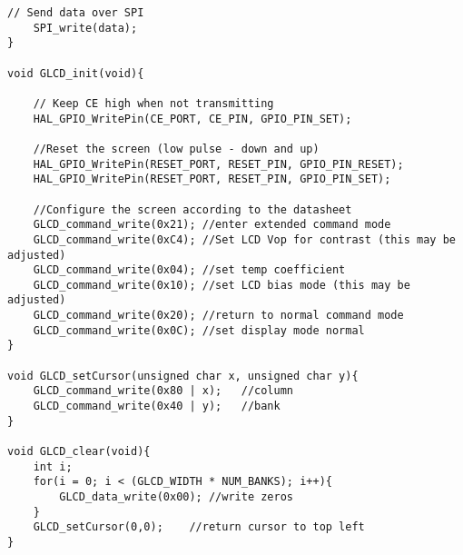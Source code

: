 \begin{lstlisting}[style=CStyle]
	// Send data over SPI
	SPI_write(data);
}

void GLCD_init(void){

	// Keep CE high when not transmitting
	HAL_GPIO_WritePin(CE_PORT, CE_PIN, GPIO_PIN_SET);

	//Reset the screen (low pulse - down and up)
	HAL_GPIO_WritePin(RESET_PORT, RESET_PIN, GPIO_PIN_RESET);
	HAL_GPIO_WritePin(RESET_PORT, RESET_PIN, GPIO_PIN_SET);

	//Configure the screen according to the datasheet
	GLCD_command_write(0x21); //enter extended command mode
	GLCD_command_write(0xC4); //Set LCD Vop for contrast (this may be adjusted)
	GLCD_command_write(0x04); //set temp coefficient
	GLCD_command_write(0x10); //set LCD bias mode (this may be adjusted)
	GLCD_command_write(0x20); //return to normal command mode
	GLCD_command_write(0x0C); //set display mode normal
}

void GLCD_setCursor(unsigned char x, unsigned char y){
	GLCD_command_write(0x80 | x);	//column
	GLCD_command_write(0x40 | y);	//bank
}

void GLCD_clear(void){
	int i;
	for(i = 0; i < (GLCD_WIDTH * NUM_BANKS); i++){
		GLCD_data_write(0x00); //write zeros
	}
	GLCD_setCursor(0,0);	//return cursor to top left
}


\end{lstlisting}
